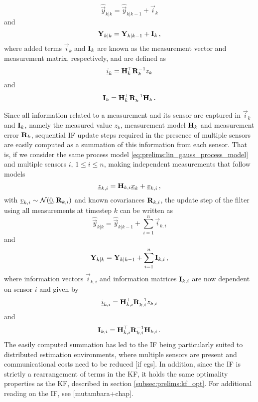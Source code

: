 \begin{equation}\label{eq:prelims:if_vec_update_single}
    \hat{\vec{y}}_{k|k} = \hat{\vec{y}}_{k|k-1} + \vec{i}_k
\end{equation}
and
\begin{equation}\label{eq:prelims:if_mat_update_single}
    {\ensuremath{{\mathbf{Y}}}}_{k|k} = {{\mathbf{Y}}}_{k|k-1} + {{\mathbf{I}}}_k\,,
\end{equation}
where added terms $\vec{i}_k$ and ${{\mathbf{I}}}_k$ are known as the measurement vector and measurement matrix, respectively, and are defined as
\begin{equation}\label{eq:prelims:if_single_m_vec_defn}
    {\underline{i}}_k = {{\mathbf{H}}}_k^\top{\ensuremath{{\mathbf{R}}}}_k^{-1}z_k
\end{equation}
and
\begin{equation}\label{eq:prelims:if_single_m_mat_defn}
    {\ensuremath{{\mathbf{I}}}}_k = {{\mathbf{H}}}_k^\top{\ensuremath{{\mathbf{R}}}}_k^{-1}{{\mathbf{H}}}_k\,.
\end{equation}

Since all information related to a measurement and its sensor are captured in $\vec{i}_k$ and ${{\mathbf{I}}}_k$, namely the measured value $z_k$, measurement model ${{\mathbf{H}}}_k$ and measurement error ${{\mathbf{R}}}_k$, sequential IF update steps required in the presence of multiple sensors are easily computed as a summation of this information from each sensor. That is, if we consider the same process model \eqref{eq:prelims:lin_gauss_process_model} and multiple sensors $i$, $1\leq i\leq n$, making independent measurements that follow models
\begin{equation}
    {\underline{z}}_{k,i} = {{\mathbf{H}}}_{k,i} {\underline{x}}_k + {\underline{v}}_{k,i}\,,
\end{equation}
with ${\underline{v}}_{k,i}\sim\mathcal{N}({\underline{0}},{{\mathbf{R}}}_{k,i})$ and known covariances ${{\mathbf{R}}}_{k,i}$, the update step of the filter using all measurements at timestep $k$ can be written as
\begin{equation}\label{eq:prelims:if_vec_update}
    \hat{\vec{y}}_{k|k} = \hat{\vec{y}}_{k|k-1} + \sum_{i=1}^n\vec{i}_{k,i}
\end{equation}
and
\begin{equation}\label{eq:prelims:if_mat_update}
    {\ensuremath{{\mathbf{Y}}}}_{k|k} = {{\mathbf{Y}}}_{k|k-1} + \sum_{i=1}^n{{\mathbf{I}}}_{k,i}\,,
\end{equation}
where information vectors $\vec{i}_{k,i}$ and information matrices ${{\mathbf{I}}}_{k,i}$ are now dependent on sensor $i$ and given by
\begin{equation}\label{eq:prelims:if_m_vec_defn}
    {\underline{i}}_{k,i} = {{\mathbf{H}}}_{k,i}^\top{\ensuremath{{\mathbf{R}}}}_{k,i}^{-1}z_{k,i}
\end{equation}
and
\begin{equation}\label{eq:prelims:if_m_mat_defn}
    {\ensuremath{{\mathbf{I}}}}_{k,i} = {{\mathbf{H}}}_{k,i}^\top{\ensuremath{{\mathbf{R}}}}_{k,i}^{-1}{{\mathbf{H}}}_{k,i}\,.
\end{equation}
The easily computed summation has led to the IF being particularly suited to distributed estimation environments, where multiple sensors are present and communicational costs need to be reduced [if egs]. In addition, since the IF is strictly a rearrangement of terms in the KF, it holds the same optimality properties as the KF, described in section \ref{subsec:prelims:kf_opt}. For additional reading on the IF, see [mutambara+chap].


